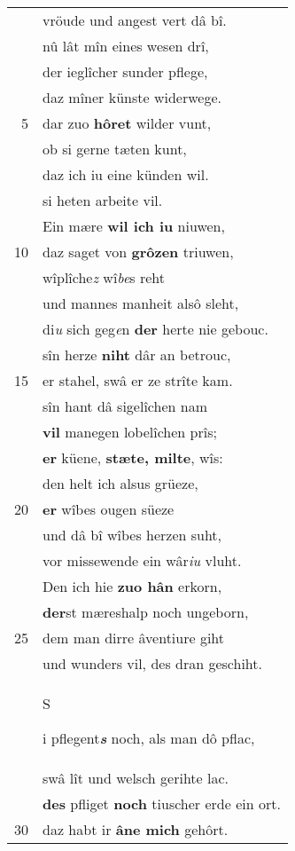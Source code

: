 \documentclass[8pt,a4paper,notitlepage]{article}
\begin{document}
\begin{table}[ht]
\begin{minipage}[t]{0.5\linewidth}
\begin{center}
\end{center}
\begin{tabular}{rl}
 & vröude und angest vert dâ bî.\\ 
 & nû lât mîn eines wesen drî,\\ 
 & der ieglîcher sunder pflege,\\ 
 & daz mîner künste widerwege.\\ 
5 & dar zuo \textbf{hôret} wilder vunt,\\ 
 & ob si gerne tæten kunt,\\ 
 & daz ich iu eine künden wil.\\ 
 & si heten arbeite vil.\\ 
 & Ein mære \textbf{wil ich iu} niuwen,\\ 
10 & daz saget von \textbf{grôzen} triuwen,\\ 
 & wîplîche\textit{z} wî\textit{be}s reht\\ 
 & und mannes manheit alsô sleht,\\ 
 & di\textit{u} sich geg\textit{e}n \textbf{der} herte nie gebouc.\\ 
 & sîn herze \textbf{niht} dâr an betrouc,\\ 
15 & er stahel, swâ er ze strîte kam.\\ 
 & sîn hant dâ sigelîchen nam\\ 
 & \textbf{vil} manegen lobelîchen prîs;\\ 
 & \textbf{er} küene, \textbf{stæte, milte}, wîs:\\ 
 & den helt ich alsus grüeze,\\ 
20 & \textbf{er} wîbes ougen süeze\\ 
 & und dâ bî wîbes herzen suht,\\ 
 & vor missewende ein wâr\textit{iu} vluht.\\ 
 & Den ich hie \textbf{zuo hân} erkorn,\\ 
 & \textbf{der}st mæreshalp noch ungeborn,\\ 
25 & dem man dirre âventiure giht\\ 
 & und wunders vil, des dran geschiht.\\ 
 & \begin{large}S\end{large}i pflegent\textit{\textbf{s}} noch, als man dô pflac,\\ 
 & swâ lît und welsch gerihte lac.\\ 
 & \textbf{des} pfliget \textbf{noch} tiuscher erde ein ort.\\ 
30 & daz habt ir \textbf{âne mich} gehôrt.\\ 

\end{tabular}
\end{minipage}
\end{table}
\end{document}
